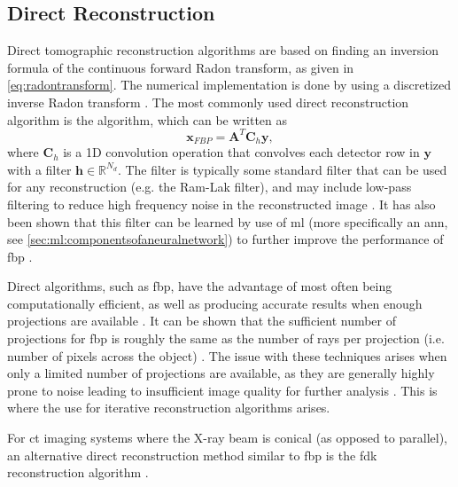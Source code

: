 \subsection{Direct Reconstruction}
Direct tomographic reconstruction algorithms are based on finding an inversion formula of the continuous forward Radon transform, as given in \cref{eq:radontransform}. The numerical implementation is done by using a discretized inverse Radon transform \cite{jimaging4110128}. The most commonly used direct reconstruction algorithm is the  algorithm, which can be written as \cite{jimaging4110128}
\begin{equation}
    \label{eq:fbp}
    \bm{x}_{FBP} = \bm{A}^T \bm{C}_h \bm{y},
\end{equation}
where $\bm{C}_h$ is a 1D convolution operation that convolves each detector row in $\bm{y}$ with a filter $\bm{h} \in \mathbb{R}^{N_d}$. The filter is typically some standard filter that can be used for any reconstruction (e.g. the Ram-Lak filter), and may include low-pass filtering to reduce high frequency noise in the reconstructed image \cite{681991}. It has also been shown that this filter can be learned by use of \gls{ml} (more specifically an \gls{ann}, see \cref{sec:ml:componentsofaneuralnetwork}) to further improve the performance of \gls{fbp} \cite{6607157}. 

Direct algorithms, such as \gls{fbp}, have the advantage of most often being computationally efficient, as well as producing accurate results when enough projections are available \cite{jimaging4110128}. It can be shown that the sufficient number of projections for \gls{fbp} is roughly the same as the number of rays per projection (i.e. number of pixels across the object) \cite[59,183-186]{KakSlaney98}. The issue with these techniques arises when only a limited number of projections are available, as they are generally highly prone to noise leading to insufficient image quality for further analysis \cite{jimaging4110128}. This is where the use for iterative reconstruction algorithms arises.

For \gls{ct} imaging systems where the X-ray beam is conical (as opposed to parallel), an alternative direct reconstruction method similar to \gls{fbp} is the \gls{fdk} reconstruction algorithm \cite{Feldkamp:84}. 

